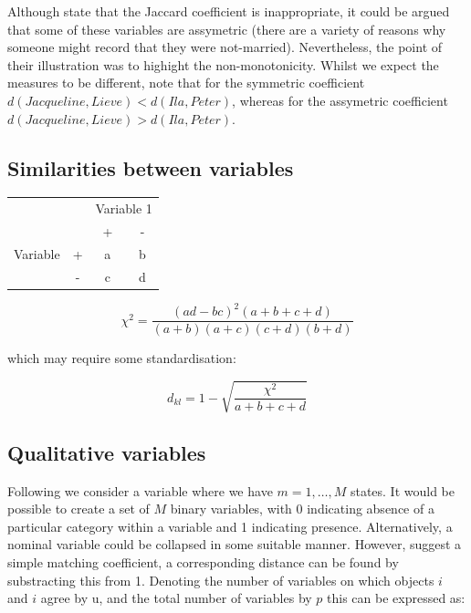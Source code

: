 Although \cite{Kaufman+Rousseeuw:1989} state that the Jaccard coefficient is inappropriate, it could be argued that some of these variables are assymetric (there are a variety of reasons why someone might record that they were not-married).   Nevertheless, the point of their illustration was to highight the non-monotonicity.   Whilst we expect the measures to be different, note that for the symmetric coefficient $d(Jacqueline, Lieve) < d(Ila, Peter)$, whereas for the assymetric coefficient $d(Jacqueline, Lieve) > d(Ila, Peter)$.  


\subsection{Similarities between variables}

\begin{table}
\begin{center}
\begin{tabular}{cccc}
 && \multicolumn{2}{c}{Variable 1} \\
&& + & - \\
Variable & + & a & b\\
 & - & c & d\\
\end{tabular}
\end{center}
\end{table}


\begin{displaymath}
\chi^{2} = \frac{(ad-bc)^{2} (a + b + c + d)}
{(a + b)(a + c) (c + d) (b + d)}
\end{displaymath}

which may require some standardisation:

\begin{displaymath}
d_{kl} = 1 - \sqrt{\frac{\chi^{2}}{a  + b + c + d}}
\end{displaymath}


\subsection{Qualitative variables}
\label{qualitative}

Following \cite{Kaufman+Rousseeuw:1989} we consider a variable where we have $m = 1, \ldots, M$ states.   It would be possible to create a set of $M$ binary variables, with 0 indicating absence of a particular category within a variable and 1 indicating presence.   Alternatively, a nominal variable could be collapsed in some suitable manner.   However, \cite{Sokal+Michener:1958} suggest a simple matching coefficient, a corresponding distance can be found by substracting this from 1.   Denoting the number of variables on which objects $i$ and $i$ agree by u, and the total number of variables by $p$ this can be expressed as:

